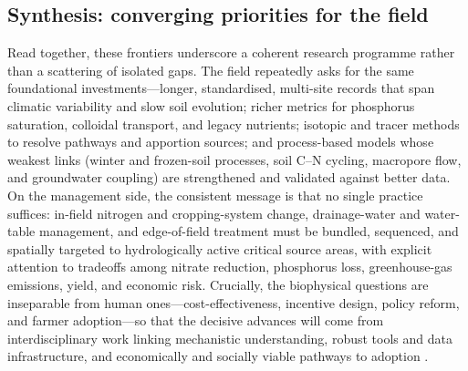 \subsection{Synthesis: converging priorities for the field}

Read together, these frontiers underscore a coherent research programme rather than a scattering of isolated gaps. The field repeatedly asks for the same foundational investments---longer, standardised, multi-site records that span climatic variability and slow soil evolution; richer metrics for phosphorus saturation, colloidal transport, and legacy nutrients; isotopic and tracer methods to resolve pathways and apportion sources; and process-based models whose weakest links (winter and frozen-soil processes, soil C--N cycling, macropore flow, and groundwater coupling) are strengthened and validated against better data. On the management side, the consistent message is that no single practice suffices: in-field nitrogen and cropping-system change, drainage-water and water-table management, and edge-of-field treatment must be bundled, sequenced, and spatially targeted to hydrologically active critical source areas, with explicit attention to tradeoffs among nitrate reduction, phosphorus loss, greenhouse-gas emissions, yield, and economic risk. Crucially, the biophysical questions are inseparable from human ones---cost-effectiveness, incentive design, policy reform, and farmer adoption---so that the decisive advances will come from interdisciplinary work linking mechanistic understanding, robust tools and data infrastructure, and economically and socially viable pathways to adoption \parencite{Ma2025,SKAGGS1994,Ferin2023,Kvítek2023,Baulch2019}.